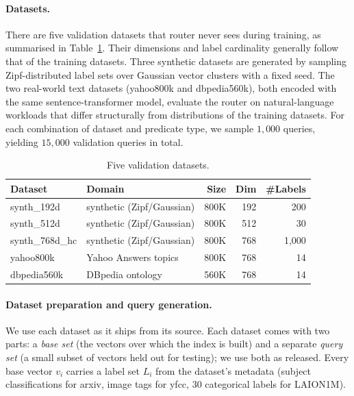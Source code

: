 \paragraph{Datasets.}
There are five validation datasets that router never sees during training, as summarised in Table~\ref{tab:validation-datasets}. Their dimensions and label cardinality generally follow that of the training datasets. Three synthetic datasets are generated by sampling Zipf-distributed label sets over Gaussian vector clusters with a fixed seed.
The two real-world text datasets (yahoo800k and dbpedia560k), both encoded with the same sentence-transformer model, evaluate the router on natural-language workloads that differ structurally from distributions of the training datasets. For each combination of dataset and predicate type, we sample $1{,}000$ queries, yielding $15{,}000$ validation queries in total.

\begin{table}[!htbp]
\centering
\caption{Five validation datasets.%
}
\label{tab:validation-datasets}
\small
\setlength{\tabcolsep}{4pt}
\begin{tabular}{@{}llrrr@{}}
\toprule
Dataset & Domain & Size & Dim & \#Labels \\
\midrule
synth\_192d     & synthetic (Zipf/Gaussian)                    & 800K & 192  &   200 \\
synth\_512d     & synthetic (Zipf/Gaussian)                    & 800K & 512  &    30 \\
synth\_768d\_hc & synthetic (Zipf/Gaussian)                    & 800K & 768  & 1{,}000 \\
\midrule
yahoo800k       & Yahoo Answers topics~\cite{Zhang2015CharCNN} & 800K & 768  &    14 \\
dbpedia560k     & DBpedia ontology~\cite{Zhang2015CharCNN}     & 560K & 768  &    14 \\
\bottomrule
\end{tabular}
\end{table}



\paragraph{Dataset preparation and query generation.}
We use each dataset as it ships from its source. Each dataset comes with two parts: a \emph{base set} (the vectors over which the index is built) and a separate \emph{query set} (a small subset of vectors held out for testing); we use both as released. Every base vector $v_i$ carries a label set $L_i$ from the dataset's metadata (subject classifications for arxiv, image tags for yfcc, $30$ categorical labels for LAION1M).

